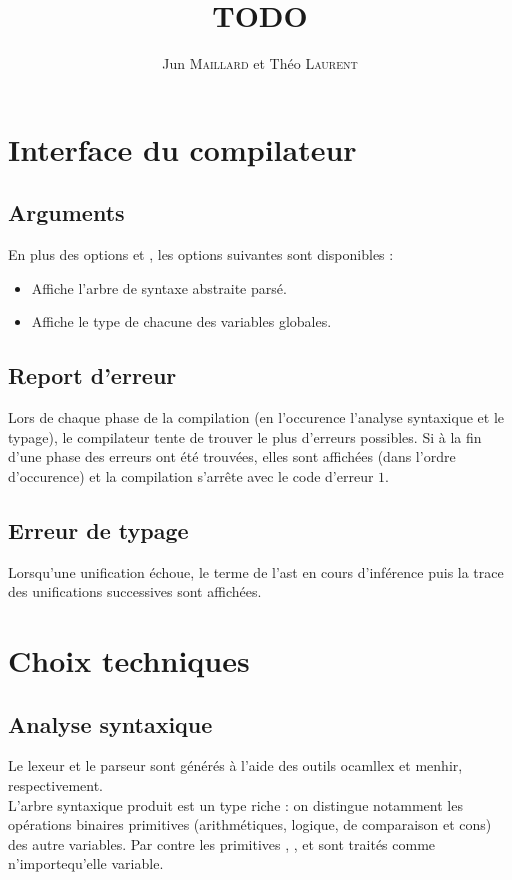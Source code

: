 \documentclass[a4paper]{article}
\title{TODO}
\author{Jun \textsc{Maillard} et Théo \textsc{Laurent}}
\begin{document}
\maketitle


\section{Interface du compilateur}

\subsection{Arguments}
En plus des options  et , les options suivantes sont disponibles :
\begin{itemize}
\item[\PVerb{--print-ast}] Affiche l'arbre de syntaxe abstraite parsé.
\item[\PVerb{--print-type}] Affiche le type de chacune des variables globales.
\end{itemize}

\subsection{Report d'erreur}
Lors de chaque phase de la compilation (en l'occurence l'analyse syntaxique et le typage), le compilateur tente de trouver le plus d'erreurs possibles. Si à la fin d'une phase des erreurs ont été trouvées, elles sont affichées (dans l'ordre d'occurence) et la compilation s'arrête avec le code d'erreur $1$.

\subsection{Erreur de typage}
Lorsqu'une unification échoue, le terme de l'ast en cours d'inférence puis la trace des unifications successives sont affichées.

\section{Choix techniques}
\subsection{Analyse syntaxique}
Le lexeur et le parseur sont générés à l'aide des outils ocamllex et menhir, respectivement. \\
L'arbre syntaxique produit est un type riche : on distingue notamment les opérations binaires primitives (arithmétiques, logique, de comparaison et cons) des autre variables. Par contre les primitives , ,  et  sont traités comme n'importequ'elle variable.
\end{document}

